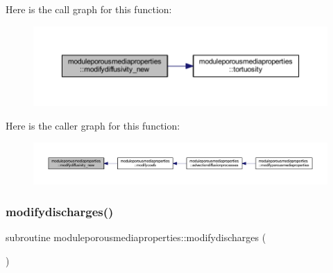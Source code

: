 Here is the call graph for this function\+:\nopagebreak
\begin{figure}[H]
\begin{center}
\leavevmode
\includegraphics[width=350pt]{namespacemoduleporousmediaproperties_aed31037cfdb4a26f847b51c25507a881_cgraph}
\end{center}
\end{figure}
Here is the caller graph for this function\+:\nopagebreak
\begin{figure}[H]
\begin{center}
\leavevmode
\includegraphics[width=350pt]{namespacemoduleporousmediaproperties_aed31037cfdb4a26f847b51c25507a881_icgraph}
\end{center}
\end{figure}
\mbox{\label{namespacemoduleporousmediaproperties_a4b551b0430b61a97ca5a026b6467c003}} 
\subsubsection{\texorpdfstring{modifydischarges()}{modifydischarges()}}
{\footnotesize\ttfamily subroutine moduleporousmediaproperties\+::modifydischarges (\begin{DoxyParamCaption}{ }\end{DoxyParamCaption})\hspace{0.3cm}{\ttfamily [private]}}

